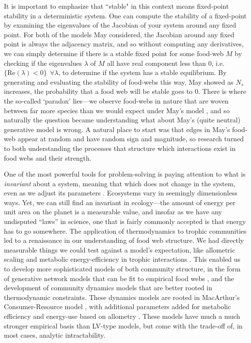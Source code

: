 \documentclass[]{article}
\begin{document}
It is important to emphasize that ``stable" in this context means
fixed-point stability in a deterministic system. One can compute the
stability of a fixed-point by examining the eigenvalues of the Jacobian
of your system around any fixed point. For both of the models May considered,
the Jacobian around any fixed point is always the adjacency matrix, and so
without computing any derivatives, we can simply determine if there is a stable fixed point for some food-web $M$ by checking if the eigenvalues
\(\lambda\) of \(M\) all have real component less
than \(0\), i.e.~\(\{ \text{Re}(\lambda) < 0 \} \ \ \forall\lambda\), to
determine if the system has a stable equilibrium. By generating and
evaluating the stability of food-webs this way, May showed as \(N_s\)
increases, the probability that a food web will be stable goes to \(0\).
There is where the so-called `paradox' lies---we observe food-webs in
nature that are woven between far more species than we would expect
under May's model \cite{albouy_marine_2019}, and so naturally the question became understanding what about May's (quite neutral) generative model is wrong. A natural place to start was that edges in May's food-web appear at random and have random sign and magnitude, so research
turned to both understanding the processes that structure which interactions exist in food webs and their strength.

One of the most powerful tools for problem-solving is paying attention
to what is \emph{invariant} about a system, meaning that which does not
change in the system, even as we adjust its parameters
\citep{polya_how_2009}. Ecosystems vary in seemingly dimensionless ways.
Yet, we can still find an invariant in ecology---the amount of energy
per unit area on the planet is a measurable value, and insofar as we
have any undisputed ``laws'' in science, one that is fairly commonly
accepted is that energy has to go somewhere. The application of
thermodynamics to trophic communities led to a renaissance in our
understanding of food web structure. We had directly measurable things
we could test against a model's expectation, like allometric scaling
\citep{cohen_food_1977,brose_allometric_2006, stouffer_robust_2006, otto_allometric_2007, gravel_trophic_2011} and metabolic energy-efficiency in
trophic interactions \citep{yodzis_body_1992}. This enabled us to
develop more sophisticated models of both community structure, in the
form of generative network models \citep{cohen_food_1977,williams_simple_2000} that can be fit to empirical food webs \citep{allesina_general_2008}, and the development of community
dynamics models that are better rooted in thermodynamic constraints. These dynamics models are rooted in MacArthur's Consumer-Resource model \cite{macarthur_species_1970, chesson_macarthurs_1990}, with additional parameters added for metabolic efficiency and energy-use based on allometry \citep{yodzis_body_1992}. These models have much a much stronger empirical basis than LV-type models, but come with the trad\renewcommand*{\arraystretch}{1.4}e-off of, in most cases, analytic intractability.
\end{document}
